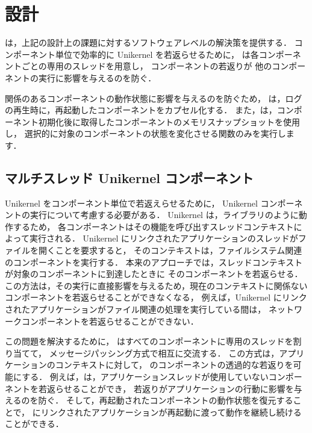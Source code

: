 \section{設計} \label{section:design}


\sysname は，上記の設計上の課題に対するソフトウェアレベルの解決策を提供する．
コンポーネント単位で効率的に Unikernel を若返らせるために，
\sysname は各コンポーネントごとの専用のスレッドを用意し，
コンポーネントの若返りが
他のコンポーネントの実行に影響を与えるのを防ぐ．

関係のあるコンポーネントの動作状態に影響を与えるのを防ぐため，
\sysname は，ログの再生時に，再起動したコンポーネントをカプセル化する．
また，\sysname は，コンポーネント初期化後に取得したコンポーネントのメモリスナップショットを使用し，
選択的に対象のコンポーネントの状態を変化させる関数のみを実行します．


\subsection{マルチスレッド Unikernel コンポーネント}

Unikernel をコンポーネント単位で若返えらせるために，
Unikernel コンポーネントの実行について考慮する必要がある．
Unikernel は，ライブラリのように動作するため，
各コンポーネントはその機能を呼び出すスレッドコンテキストによって実行される．
Unikernel にリンクされたアプリケーションのスレッドがファイルを開くことを要求すると，
そのコンテキストは，ファイルシステム関連のコンポーネントを実行する．
本来のアプローチでは，スレッドコンテキストが対象のコンポーネントに到達したときに
そのコンポーネントを若返らせる．
この方法は，その実行に直接影響を与えるため，現在のコンテキストに関係ないコンポーネントを若返らせることができなくなる，
例えば，Unikernel にリンクされたアプリケーションがファイル関連の処理を実行している間は，
ネットワークコンポーネントを若返らせることができない．

この問題を解決するために，
\sysname はすべてのコンポーネントに専用のスレッドを割り当てて，
メッセージパッシング方式で相互に交流する．
この方式は，アプリケーションのコンテキストに対して， \sysname のコンポーネントの透過的な若返りを可能にする．
例えば，\sysname は，アプリケーションスレッドが使用していないコンポーネントを若返らせることができ，
若返りがアプリケーションの行動に影響を与えるのを防ぐ．
そして，再起動されたコンポーネントの動作状態を復元することで，
\sysname にリンクされたアプリケーションが再起動に渡って動作を継続し続けることができる．


